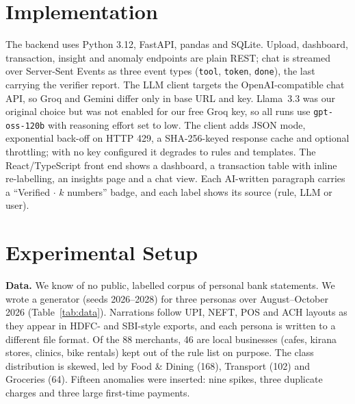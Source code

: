 \documentclass[conference]{IEEEtran}
\begin{document}
\section{Implementation}
The backend uses Python 3.12, FastAPI, pandas \cite{mckinney2010} and SQLite. Upload, dashboard, transaction, insight and anomaly endpoints are plain REST; chat is streamed over Server-Sent Events as three event types (\texttt{tool}, \texttt{token}, \texttt{done}), the last carrying the verifier report. The LLM client targets the OpenAI-compatible chat API, so Groq and Gemini differ only in base URL and key. Llama~3.3 was our original choice but was not enabled for our free Groq key, so all runs use \texttt{gpt-oss-120b} \cite{openai2025gptoss} with reasoning effort set to low. The client adds JSON mode, exponential back-off on HTTP 429, a SHA-256-keyed response cache and optional throttling; with no key configured it degrades to rules and templates. The React/TypeScript front end shows a dashboard, a transaction table with inline re-labelling, an insights page and a chat view. Each AI-written paragraph carries a ``Verified $\cdot$ $k$ numbers'' badge, and each label shows its source (rule, LLM or user).

\section{Experimental Setup}
\textbf{Data.} We know of no public, labelled corpus of personal bank statements. We wrote a generator (seeds 2026--2028) for three personas over August--October 2026 (Table~\ref{tab:data}). Narrations follow UPI, NEFT, POS and ACH layouts as they appear in HDFC- and SBI-style exports, and each persona is written to a different file format. Of the 88 merchants, 46 are local businesses (cafes, kirana stores, clinics, bike rentals) kept out of the rule list on purpose. The class distribution is skewed, led by Food \& Dining (168), Transport (102) and Groceries (64). Fifteen anomalies were inserted: nine spikes, three duplicate charges and three large first-time payments.

\begin{table}[t]
\caption{Evaluation dataset}
\label{tab:data}
\centering
{}
\end{table}
\end{document}

